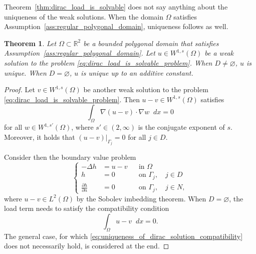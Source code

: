 \documentclass[english, 12pt, a4paper, sci, utf8, a-2b, online]{aaltothesis}
\theoremstyle{definition}
\theoremstyle{plain}
\newtheorem{theorem}{Theorem}[section]
\newcommand*\diff{\mathop{}\!d}
\numberwithin{equation}{section}
\begin{document}
Theorem~\ref{thm:dirac_load_is_solvable} does not say anything about
the uniqueness of the weak solutions. When the domain $\Omega$ satisfies
Assumption~\ref{ass:regular_polygonal_domain}, uniqueness follows as well.
\begin{theorem}
    \label{thm:uniqueness_of_dirac_solution}
    Let $\Omega \subset \mathbb{R}^2$ be a bounded polygonal domain
    that satisfies Assumption~\ref{ass:regular_polygonal_domain}.
    Let $u \in W^{1,s}(\Omega)$ be a weak solution to the problem
    \eqref{eq:dirac_load_is_solvable_problem}.
    When $D \neq \varnothing$, $u$ is unique.
    When $D = \varnothing$, $u$ is unique up to an additive constant.
\end{theorem}
\begin{proof}
    Let $v \in W^{1,s}(\Omega)$ be another weak solution to the problem
    \eqref{eq:dirac_load_is_solvable_problem}.
    Then $u - v \in W^{1,s}(\Omega)$ satisfies
    \begin{equation}
        \label{eq:uniqueness_of_dirac_solution_intmed1}
        \int_{\Omega} \nabla (u-v) \cdot \nabla w \diff x = 0
    \end{equation}
    for all $w \in W^{1,s'}(\Omega)$, where $s' \in (2, \infty)$ is the conjugate
    exponent of $s$. Moreover, it holds that $(u-v)|_{\Gamma_j} = 0$ for all $j \in D$.

    Consider then the boundary value problem
    \begin{equation}
        \label{eq:uniqueness_of_dirac_solution_aux_problem}
        \left\{
            \begin{aligned}
                -\Delta h &= u-v && \text{in } \Omega \\
                h &= 0 && \text{on } \Gamma_j, \quad j \in D \\
                \frac{\partial h}{\partial n} &= 0 && \text{on } \Gamma_j,
                \quad j \in N,
            \end{aligned}
        \right.
    \end{equation}
    where $u-v \in L^2(\Omega)$ by the Sobolev imbedding theorem.
    When $D = \varnothing$, the load term needs to satisfy the compatibility condition
    \begin{equation}
        \label{eq:uniqueness_of_dirac_solution_compatibility}
        \int_{\Omega} u - v \diff x = 0.
    \end{equation}
    The general case, for which \eqref{eq:uniqueness_of_dirac_solution_compatibility}
    does not necessarily hold, is considered at the end.


\end{proof}
\end{document}
